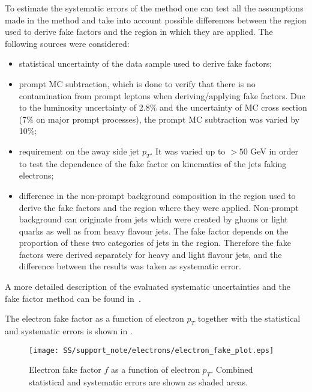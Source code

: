 To estimate the systematic errors of the method one can test all the assumptions made in the method and take into account possible differences between 
the region used to derive fake factors and the region in which they are applied. The following sources were considered:
\begin{itemize}
 \item statistical uncertainty of the data sample used to derive fake factors;
 \item prompt MC subtraction, which is done to verify that there is no contamination from prompt leptons when deriving/applying fake factors.
 Due to the luminosity uncertainty of 2.8$\%$ and the uncertainty of MC cross section (7$\%$ on major prompt processes), the prompt MC subtraction
 was varied by 10$\%$;
 \item requirement on the away side jet $p_T$. It was varied up to $>50$ GeV in order to test the dependence of the fake factor on kinematics of the jets faking electrons;
 \item difference in the non-prompt background composition in the region used to derive the fake factors and the region where they were applied.
 Non-prompt background can originate from jets which were created by gluons or light quarks as well as from heavy flavour jets.
 The fake factor depends on the proportion of these two categories of jets in the region. Therefore the fake factors were derived separately
 for heavy and light flavour jets, and the difference between the results was taken as systematic error.
\end{itemize}
A more detailed description of the evaluated systematic uncertainties and the fake factor method can be found in~\cite{anthony_thesis}.

The electron fake factor as a function of electron $p_T$ together with the statistical and systematic errors is
shown in .
\begin{figure}[h]
\begin{center}
\texttt{[image: SS/support\_note/electrons/electron\_fake\_plot.eps]}
\caption{Electron fake factor $f$ as a function of electron $p_{T}$. Combined statistical and systematic errors are shown as shaded areas.}
\label{fig:ff_e_errs}
\end{center}
\end{figure} 

